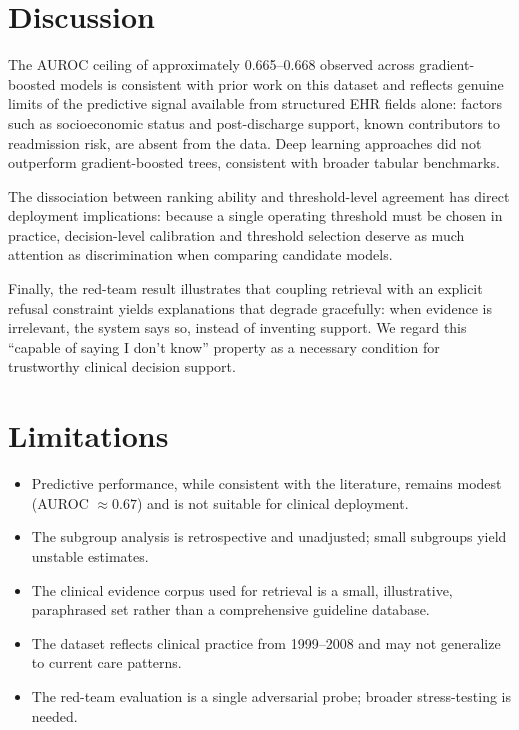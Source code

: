 \documentclass[12pt,onecolumn,journal]{IEEEtran}
\begin{document}
\section{Discussion}
\label{sec:discussion}
The AUROC ceiling of approximately 0.665--0.668 observed across gradient-boosted models is consistent with prior work on this dataset and reflects genuine limits of the predictive signal available from structured EHR fields alone: factors such as socioeconomic status and post-discharge support, known contributors to readmission risk, are absent from the data. Deep learning approaches did not outperform gradient-boosted trees, consistent with broader tabular benchmarks.

The dissociation between ranking ability and threshold-level agreement has direct deployment implications: because a single operating threshold must be chosen in practice, decision-level calibration and threshold selection deserve as much attention as discrimination when comparing candidate models.

Finally, the red-team result illustrates that coupling retrieval with an explicit refusal constraint yields explanations that degrade gracefully: when evidence is irrelevant, the system says so, instead of inventing support. We regard this ``capable of saying I don't know'' property as a necessary condition for trustworthy clinical decision support.

\section{Limitations}
\label{sec:limitations}
\begin{itemize}
    \item Predictive performance, while consistent with the literature, remains modest (AUROC $\approx 0.67$) and is not suitable for clinical deployment.
    \item The subgroup analysis is retrospective and unadjusted; small subgroups yield unstable estimates.
    \item The clinical evidence corpus used for retrieval is a small, illustrative, paraphrased set rather than a comprehensive guideline database.
    \item The dataset reflects clinical practice from 1999--2008 and may not generalize to current care patterns.
    \item The red-team evaluation is a single adversarial probe; broader stress-testing is needed.
\end{itemize}
\end{document}
